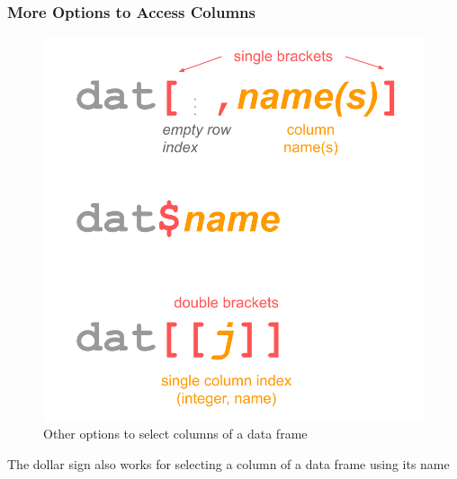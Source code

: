 \documentclass[
]{book}
\newenvironment{Shaded}{\begin{snugshade}}{\end{snugshade}}
\newcommand{\DecValTok}[1]{\textcolor[rgb]{0.00,0.00,0.81}{#1}}
\newcommand{\FloatTok}[1]{\textcolor[rgb]{0.00,0.00,0.81}{#1}}
\newcommand{\NormalTok}[1]{#1}
\newcommand{\SpecialCharTok}[1]{\textcolor[rgb]{0.00,0.00,0.00}{#1}}
\begin{document}
\hypertarget{more-options-to-access-columns}{%
\subsubsection*{More Options to Access Columns}\label{more-options-to-access-columns}}

\begin{figure}

{\centering \includegraphics[width=0.5\linewidth]{images/objects/obj-dataframe-names} 

}

\caption{Other options to select columns of a data frame}\label{fig:unnamed-chunk-187}
\end{figure}

The dollar sign also works for selecting a column of a data frame
using its name

\begin{Shaded}
\end{Shaded}
\end{document}
